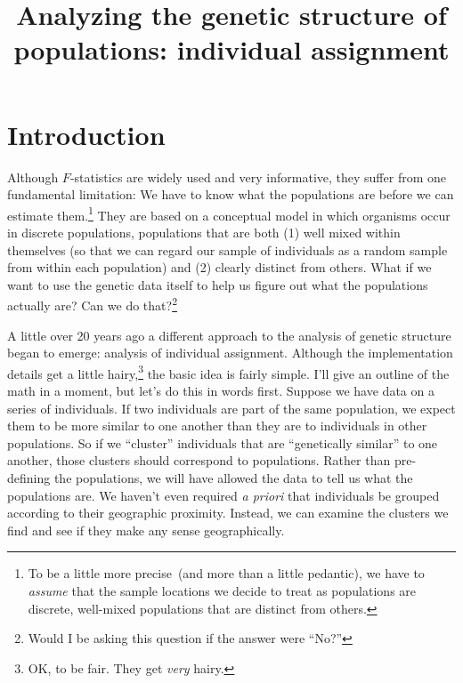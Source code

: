 \documentclass[12pt]{article}
\title{Analyzing the genetic structure of populations: individual assignment}
\begin{document}
\maketitle

\thispagestyle{first}

\section*{Introduction}

Although $F$-statistics are widely used and very informative, they
suffer from one fundamental limitation: We have to know what the
populations are before we can estimate them.\footnote{To be a little
  more precise~(and more than a little pedantic), we have to {\it
    assume\/} that the sample locations we decide to treat as
  populations are discrete, well-mixed populations that are distinct
  from others.} They are based on a conceptual model in which
organisms occur in discrete populations, populations that are both (1)
well mixed within themselves (so that we can regard our sample of
individuals as a random sample from within each population) and (2)
clearly distinct from others. What if we want to use the genetic data
itself to help us figure out what the populations actually are? Can we
do that?\footnote{Would I be asking this question if the answer were
  ``No?''}

A little over 20 years ago a different approach to the analysis of
genetic structure began to emerge: analysis of individual
assignment. Although the implementation
details get a little hairy,\footnote{OK, to be fair. They get {\it
    very\/} hairy.} the basic idea is fairly simple. I'll give an
outline of the math in a moment, but let's do this in words
first. Suppose we have data on a series of individuals. If two
individuals are part of the same population, we expect them to be more
similar to one another than they are to individuals in other
populations. So if we ``cluster'' individuals that are ``genetically
similar'' to one another, those clusters should correspond to
populations. Rather than pre-defining the populations, we will have
allowed the data to tell us what the populations are. We haven't even
required {\it a priori\/} that individuals be grouped according to
their geographic proximity. Instead, we can examine the clusters we
find and see if they make any sense geographically.
\end{document}
